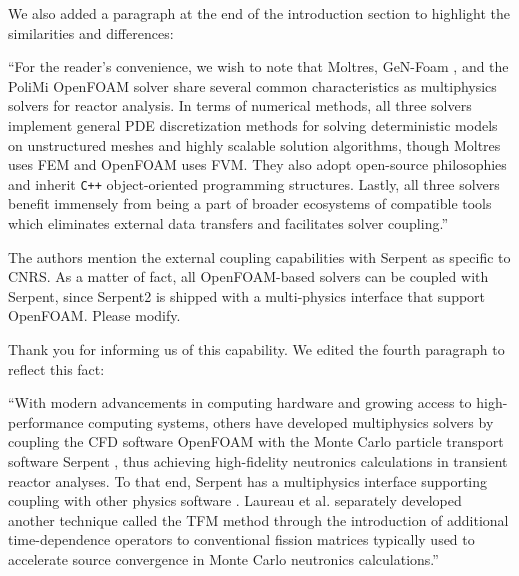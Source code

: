 \documentclass[answers,11pt]{exam}
\begin{document}
\begin{questions}
\begin{solution}
            We also added a paragraph at the end of the introduction section to
            highlight the similarities and differences:
            
            ``For the reader's convenience, we wish to note that Moltres, GeN-Foam
\cite{fiorina_gen-foam_2015}, and the PoliMi OpenFOAM solver
\cite{aufiero_development_2014} share several common characteristics as
multiphysics solvers for reactor analysis. In terms of numerical methods, all
three solvers implement general \gls{PDE} discretization methods for solving
deterministic models on unstructured meshes and highly scalable solution
algorithms, though Moltres uses \gls{FEM} and OpenFOAM uses \gls{FVM}. They
also adopt open-source philosophies and inherit \texttt{C++}
object-oriented programming structures. Lastly, all
three solvers benefit immensely from being a part of broader ecosystems of
compatible tools which eliminates external data
transfers and facilitates solver coupling.''
        \end{solution}

        \question The authors mention the external coupling capabilities with
        Serpent as specific to CNRS. As a matter of fact, all OpenFOAM-based
        solvers can be coupled with Serpent, since Serpent2 is shipped with a
        multi-physics interface that support OpenFOAM. Please modify.
        \begin{solution}
        	Thank you for informing us of this capability. We edited the fourth
        	paragraph to reflect this fact:
        	
        	``With modern advancements in computing hardware and growing access to
high-performance computing systems, others have developed multiphysics solvers
by coupling the \gls{CFD} software OpenFOAM
\cite{the_openfoam_foundation_ltd_openfoam_2021} with the Monte Carlo particle
transport software
Serpent \cite{leppanen_serpent_2014}, thus achieving high-fidelity neutronics
calculations in transient reactor analyses.
To that end, Serpent has a multiphysics interface supporting coupling
with other physics software \cite{leppanen_development_2013}.
Laureau et al. \cite{laureau_transient_2017}
separately developed another technique called the
\gls{TFM} method through the introduction of additional time-dependence
operators to conventional fission matrices typically used to accelerate source
convergence in Monte Carlo neutronics calculations.''
        \end{solution}


\end{questions}
\end{document}
